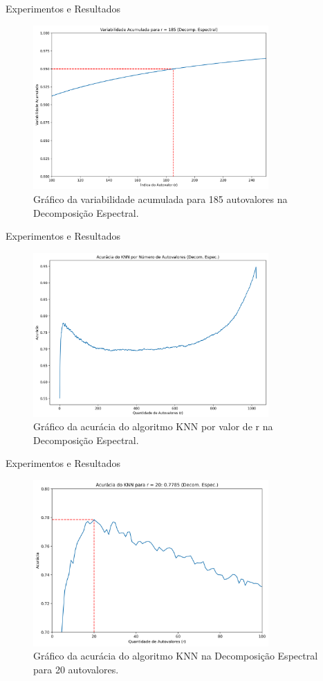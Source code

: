 \documentclass{beamer}
\theoremstyle{definition}
\begin{document}
\begin{frame}{Experimentos e Resultados}
\begin{figure}[H]
  \centering
  \caption{Gráfico da variabilidade acumulada para 185 autovalores na Decomposição Espectral.}
  \includegraphics[width=9cm]{var_acu_espectral_185}
\end{figure}
\end{frame}

\begin{frame}{Experimentos e Resultados}
\begin{figure}[H]
  \centering
  \caption{Gráfico da acurácia do algoritmo KNN por valor de r na Decomposição Espectral.}
  \includegraphics[width=9cm]{acuracia_espectral}
\end{figure}
\end{frame}

\begin{frame}{Experimentos e Resultados}
\begin{figure}[H]
  \centering
  \caption{Gráfico da acurácia do algoritmo KNN na Decomposição Espectral para 20 autovalores.}
  \includegraphics[width=9cm]{acuracia_espectral_20}
\end{figure}
\end{frame}
\end{document}
